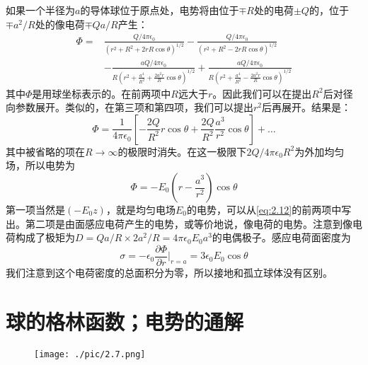 \documentclass[12pt]{book}
\numberwithin{equation}{chapter}
\numberwithin{figure}{chapter}
\numberwithin{footnote}{page}
\begin{document}
如果一个半径为$a$的导体球位于原点处，电势将由位于$\mp R$处的电荷$\pm Q$的，位于$\mp a^2/R$处的像电荷$\mp Qa/R$产生：
\begin{equation}\label{eq:2.12}
    \begin{aligned}
        \Phi=&\frac{Q/4\pi\epsilon_0}{(r^2+R^2+2rR\cos \theta)^{1/2}}-\frac{Q/4\pi\epsilon_0}{(r^2+R^2-2rR\cos \theta)^{1/2}}\\
        &-\frac{aQ/4\pi\epsilon_0}{R(r^2+\frac{a^4}{R^2}+\frac{2a^2r}{R}\cos \theta)^{1/2}}+\frac{aQ/4\pi\epsilon_0}{R(r^2+\frac{a^4}{R^2}-\frac{2a^2r}{R}\cos \theta)^{1/2}}
    \end{aligned}
\end{equation}
其中$\Phi$是用球坐标表示的。在前两项中$R$远大于$r$。因此我们可以在提出$R^2$后对径向参数展开。类似的，在第三项和第四项，我们可以提出$r^2$后再展开。结果是：
\begin{equation}\label{eq:2.13}
    \Phi=\frac{1}{4\pi\epsilon_0}[-\frac{2Q}{R^2}r\cos\theta+\frac{2Q}{R^2}\frac{a^3}{r^2}\cos\theta]+\dots
\end{equation}
其中被省略的项在$R\to\infty$的极限时消失。在这一极限下$2Q/4\pi\epsilon_0R^2$为外加均匀场，所以电势为
\begin{equation}\label{eq:2.14}
    \Phi=-E_0(r-\frac{a^3}{r^2})\cos\theta
\end{equation}
第一项当然是$(-E_0z)$，就是均匀电场$E_0$的电势，可以从\autoref{eq:2.12}的前两项中写出。第二项是由面感应电荷产生的电势，或等价地说，像电荷的电势。注意到像电荷构成了极矩为$D=Qa/R\times2a^2/R=4\pi\epsilon_0E_0a^3$的电偶极子。感应电荷面密度为
\begin{equation}\label{eq:2.15}
    \sigma=-\epsilon_0\frac{\partial\Phi}{\partial r}|_{r=a}=3\epsilon_0E_0\cos\theta
\end{equation}
我们注意到这个电荷密度的总面积分为零，所以接地和孤立球体没有区别。

\section{球的格林函数；电势的通解}\label{sec:2.6}

\begin{figure}[!ht]
    \centering
    \texttt{[image: ./pic/2.7.png]}
    \captionsetup{justification=raggedright, singlelinecheck=false}
    \caption{}
    \label{fig:2.7}
\end{figure}
\end{document}
